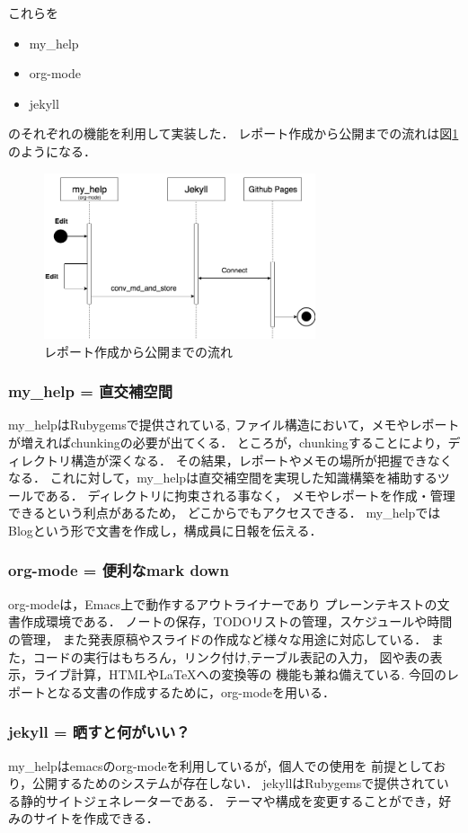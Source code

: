 \documentclass{hissymp}
\begin{document}
これらを
\begin{itemize}
\item my\_help
\item org-mode
\item jekyll
\end{itemize}
のそれぞれの機能を利用して実装した．
レポート作成から公開までの流れは図\ref{fig:org74680a7}のようになる．
\begin{figure}[htbp]
\centering
\includegraphics[width=8cm]{./images/myhelp_to_jekyll.png}
\caption{\label{fig:org74680a7}
レポート作成から公開までの流れ}
\end{figure}

\subsubsection{my\_help = 直交補空間}
\label{sec:orgbf081d6}
my\_helpはRubygemsで提供されている,
ファイル構造において，メモやレポートが増えればchunkingの必要が出てくる．
ところが，chunkingすることにより，ディレクトリ構造が深くなる．
その結果，レポートやメモの場所が把握できなくなる．
これに対して，my\_helpは直交補空間を実現した知識構築を補助するツールである．
ディレクトリに拘束される事なく，
メモやレポートを作成・管理できるという利点があるため，
どこからでもアクセスできる．
my\_helpではBlogという形で文書を作成し，構成員に日報を伝える．

\subsubsection{org-mode = 便利なmark down}
\label{sec:org656c47c}
org-modeは，Emacs上で動作するアウトライナーであり
プレーンテキストの文書作成環境である．
ノートの保存，TODOリストの管理，スケジュールや時間の管理，
また発表原稿やスライドの作成など様々な用途に対応している．
また，コードの実行はもちろん，リンク付け,テーブル表記の入力，
図や表の表示，ライブ計算，HTMLや\LaTeX{}への変換等の
機能も兼ね備えている.
今回のレポートとなる文書の作成するために，org-modeを用いる．

\subsubsection{jekyll = 晒すと何がいい？}
\label{sec:orga98a81f}
my\_helpはemacsのorg-modeを利用しているが，個人での使用を
前提としており，公開するためのシステムが存在しない．
jekyllはRubygemsで提供されている静的サイトジェネレーターである．
テーマや構成を変更することができ，好みのサイトを作成できる．
\end{document}
